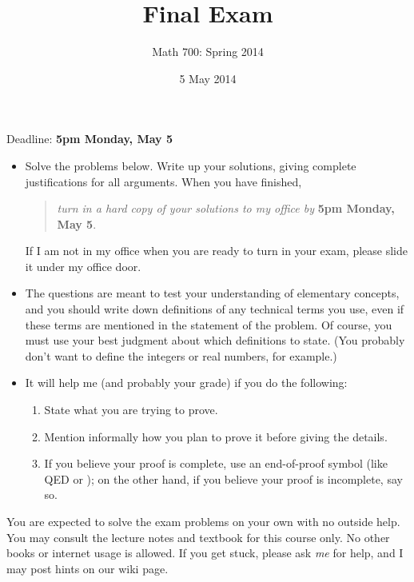 \documentclass[11pt]{paper}
\author{}
\title{Final Exam}
\subtitle{Math 700: Spring 2014}
\date{5 May 2014}
\theoremstyle{remark}
\newcommand{\<}{\ensuremath{\langle}}
\renewcommand{\>}{\ensuremath{\rangle}}
\begin{document}
\maketitle
\vskip-1cm

\noindent Deadline: {\bf 5pm Monday, May 5}

\vskip5mm

\begin{itemize}
\item 
Solve the problems below. Write up your solutions,
giving complete justifications for all arguments.  When you have finished, 
\begin{quote}
\emph{turn in a hard copy of your solutions to my office by} {\bf 5pm Monday, May 5}. 
\end{quote}
If I am not in my office when you are ready to turn in your exam, 
please slide it under my office door.

\medskip

\item The questions are meant to test your understanding of elementary concepts, and
you should write down definitions of any technical terms you use, even if these
terms are mentioned in the statement of the problem. Of course, you must use
your best judgment about which definitions to state.  (You probably don't want
to define the integers or real numbers, for example.)

\medskip

\item It will help me (and probably your grade) if you do the following:
\begin{enumerate}
\item 
State what you are trying to prove.
\item 
Mention informally how you plan to prove it before giving the details.
\item If you believe your proof is complete, use an end-of-proof symbol (like
  QED or \qedsymbol); on the other hand, if you believe your proof is
  incomplete, say so.
\end{enumerate}
\end{itemize}

 You are expected to solve the exam problems on your own
  with no outside help.  You may consult the lecture notes and textbook for this
  course only.  No other books or internet usage is allowed.
  If you get stuck, please ask \emph{me} for help, and I may post hints on our wiki page. 
\end{document}
